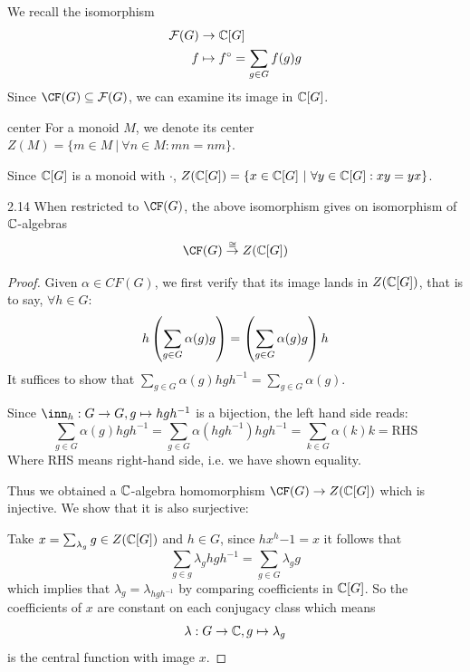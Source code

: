 \documentclass[twoside = false,	%
		headsepline,		%
		parskip = true,
		]{scrbook}						%
\begin{document}
    We recall the isomorphism
    \begin{equation*}
    \begin{split}
        \mathcal F(G) &\to \mathbb C[G] \\
            f &\mapsto f^\circ = \sum_{g \in G}f(g)g
    \end{split}
    \end{equation*}
    Since $\CF(G) \subseteq \cF(G)$, we can examine its image in $\mathbb C[G]$.
    
    \begin{definition*}{center}
        For a monoid $M$, we denote its center $Z(M) = \{m \in M \ | \ \forall n \in M: mn = nm\}$.
    \end{definition*}
    Since $\mathbb C[G]$ is a monoid with $\cdot$, $Z(\mathbb C[G]) = \{x \in \mathbb C[G] \ | \ \forall y \in \mathbb C[G]: xy = yx \}$.

    \begin{corollary}{}{2.14}
        When restricted to $\CF(G)$, the above isomorphism gives on isomorphism of $\mathbb C$-algebras
        \begin{equation*}
            \CF(G) \overset{\cong}{\to} Z(\C[G])
        \end{equation*}
    \end{corollary}
    \begin{proof}
        Given $\alpha \in CF(G)$, we first verify that its image lands in $Z(\mathbb C[G])$, that is to say, $\forall h \in G$:
        \begin{equation*}
            h \left( \sum_{g \in G} \alpha(g) g\right) = \left( \sum_{g \in G} \alpha(g)g\right)h
        \end{equation*}
        It suffices to show that $\sum_{g \in G} \alpha(g) h g h^{-1} = \sum_{g \in G} \alpha(g)$.
        
        Since $\inn_h: G \to G, g \mapsto hgh^{-1}$ is a bijection, the left hand side reads:
        \begin{equation*}
            \sum_{g \in G} \alpha(g) h g h^{-1} = \sum_{g \in G} \alpha(hgh^{-1}) h g h^{-1} = \sum_{k \in G} \alpha(k) k = \text{RHS}
        \end{equation*}
        Where RHS means right-hand side, i.e. we have shown equality.

        Thus we obtained a $\mathbb C$-algebra homomorphism $\CF(G) \to Z(\C[G])$ which is injective. We show that it is also surjective:

        Take $x = \sum_{\lambda_g} g \in Z(\mathbb C[G])$ and $h \in G$, since $hx^h{-1} = x$ it follows that
        \begin{equation*}
            \sum_{g \in g} \lambda_g h g h^ {-1} = \sum_{g \in G} \lambda_g g
        \end{equation*}
        which implies that $\lambda_g = \lambda_{hgh^{-1}}$ by comparing coefficients in $\mathbb C[G]$. So the coefficients of $x$ are constant on each conjugacy class which means
        \begin{equation*}
            \lambda: G \to \mathbb C, g \mapsto \lambda_g 
        \end{equation*}
        is the central function with image $x$.
    \end{proof}
\end{document}
